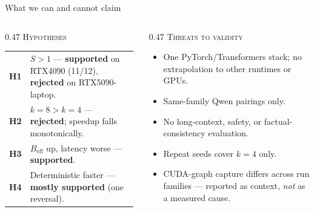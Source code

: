 \documentclass[aspectratio=169, 11pt]{beamer}
\begin{document}
\begin{frame}{What we can and cannot claim}
  \begin{columns}[T,onlytextwidth]
    \begin{column}{0.47\textwidth}
      {\footnotesize\color{ink2}\textsc{Hypotheses}}\par
      \vskip5pt
      {\small
      \begin{tabular}{@{}p{0.08\linewidth}@{}>{\raggedright\arraybackslash}p{0.90\linewidth}@{}}
        \textbf{H1} & $S>1$ --- \textcolor{accent}{\textbf{supported}} on RTX4090 (11/12), \textcolor{warm}{\textbf{rejected}} on RTX5090-laptop.\\[4pt]
        \textbf{H2} & $k{=}8 > k{=}4$ --- \textcolor{warm}{\textbf{rejected}}; speedup falls monotonically.\\[4pt]
        \textbf{H3} & $B_{\text{eff}}$ up, latency worse --- \textcolor{accent}{\textbf{supported}}.\\[4pt]
        \textbf{H4} & Deterministic faster --- \textcolor{accent}{\textbf{mostly supported}} (one reversal).\\
      \end{tabular}}
    \end{column}
    \begin{column}{0.47\textwidth}
      {\footnotesize\color{ink2}\textsc{Threats to validity}}\par
      \vskip5pt
      \begin{itemize}\itemsep4pt\small
        \item One PyTorch/Transformers stack; no extrapolation to other
              runtimes or GPUs.
        \item Same-family Qwen pairings only.
        \item No long-context, safety, or factual-consistency evaluation.
        \item Repeat seeds cover $k{=}4$ only.
        \item CUDA-graph capture differs across run families --- reported as
              context, \emph{not} as a measured cause.
      \end{itemize}
    \end{column}
  \end{columns}
\end{frame}
\end{document}
